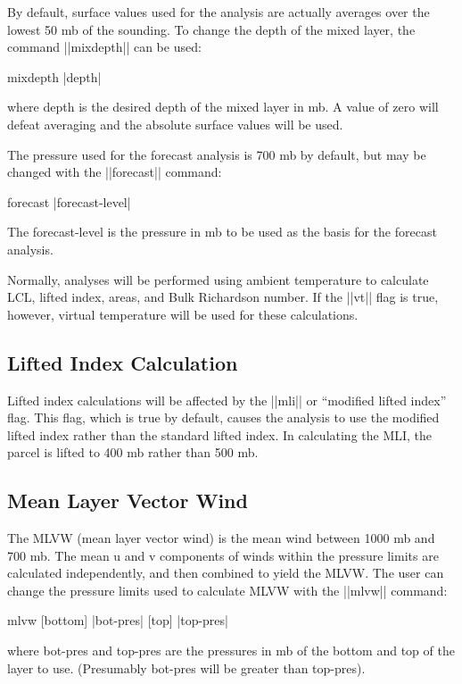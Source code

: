 By default, surface values used for the analysis are actually averages over
the lowest 50 mb of the sounding.  To change the depth of the mixed layer,
the command ||mixdepth|| can be used:
\begin{example}
	mixdepth |depth|
\end{example}
where {\pf depth} is the desired depth of the mixed layer in mb.  A value
of zero will defeat averaging and the absolute surface values will be used.

The pressure used for the forecast analysis is 700 mb by default, but may
be changed with the ||forecast|| command:
\begin{example}
	forecast |forecast-level|
\end{example}
The {\pf forecast-level} is the pressure in mb to be used as the basis
for the forecast analysis.

Normally, analyses will be performed using ambient temperature to calculate
LCL, lifted index, areas, and Bulk Richardson number.  If the ||vt|| flag
is true, however, virtual temperature will be used for these calculations.

\subsection{Lifted Index Calculation}
Lifted index calculations will be affected by the ||mli|| or ``modified
lifted index'' flag.  This flag, which is true by default, causes the
analysis to use the modified lifted index rather than the standard lifted
index.  In calculating the MLI, the parcel is lifted to 400 mb rather than
500 mb.

\subsection{Mean Layer Vector Wind}
The MLVW (mean layer vector wind) is the mean wind between 1000 mb and 700 mb.
The mean u and v components of winds within the pressure limits are calculated
independently, and then combined to yield the MLVW.  The user can change the
pressure limits used to calculate MLVW with the ||mlvw|| command:
\begin{example}
	mlvw [bottom] |bot-pres| [top] |top-pres|
\end{example}
where {\pf bot-pres} and {\pf top-pres} are the pressures in mb of the bottom
and top of the layer to use.  (Presumably {\pf bot-pres} will be greater 
than {\pf top-pres}).

